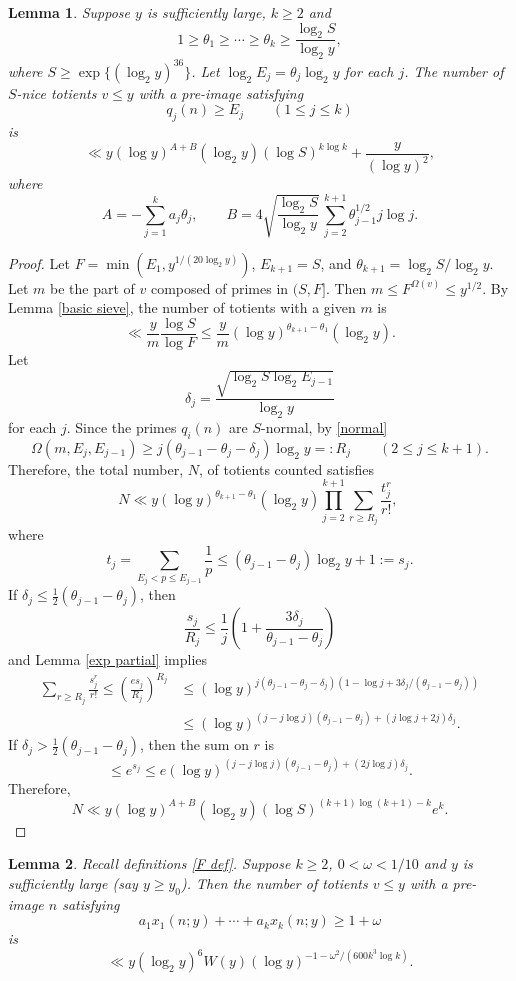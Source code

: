 \documentclass[11pt]{amsart}
\theoremstyle{remark}
\theoremstyle{plain}
\newtheorem{lem}{Lemma}[section]
\numberwithin{equation}{section}
\newcommand{\del}{\ensuremath{\delta}}
\renewcommand{\(}{\left(}
\renewcommand{\)}{\right)}
\newcommand{\pfrac}[2]{\left(\frac{#1}{#2}\right)}
\renewcommand{\le}{\leqslant}
\renewcommand{\ge}{\geqslant}
\renewcommand{\d}{\delta}
\newcommand{\om}{\Omega}
\begin{document}
\begin{lem} \label{AB} Suppose  $y$ is sufficiently large,
$k\ge 2$ and 
$$
1\ge \theta_1 \ge \cdots \ge \theta_{k} \ge \frac{\log_2 S}{ \log_2 y},
$$
where $S\ge \exp\{(\log_2 y)^{36}\}$.
Let $\log_2 E_j = \theta_j \log_2 y$ for
each $j$.  The number
of $S$-nice totients $v\le y$ with a pre-image satisfying
$$
q_j(n) \ge E_j \qquad (1\le j\le k)
$$
is
$$
\ll y(\log y)^{A+B}(\log_2 y)(\log S)^{k\log k} + \frac{y}{(\log y)^2},
$$
where
$$
A = -\sum_{j=1}^k a_j \theta_j, \qquad
B = 4 \sqrt{\frac{\log_2 S}{\log_2 y}}\,
 \sum_{j=2}^{k+1} \theta_{j-1}^{1/2} j\log j.
$$
\end{lem}

\begin{proof}
Let $F=\min(E_1,y^{1/(20\log_2 y)})$, $E_{k+1}=S$, and
$\theta_{k+1}=\log_2 S/\log_2 y$.
Let $m$ be the part of $v$ composed of primes in $(S,F]$.  Then
$m \le F^{\om(v)} \le y^{1/2}.$
By Lemma \ref{basic sieve}, the number of totients with a
given $m$ is
$$
\ll \frac{y}{m} \frac{\log S}{\log F} \le \frac{y}{m}(\log y)^
{\theta_{k+1}-\theta_1} (\log_2 y).
$$
Let 
$$
\d_j=\frac{\sqrt{\log_2 S \log_2 E_{j-1}}}{\log_2 y}
$$
for each $j$.
Since the primes $q_i(n)$ are $S$-normal, by \eqref{normal} 
$$
\om(m,E_j,E_{j-1}) \ge j(\theta_{j-1}-\theta_j-\d_j)
\log_2 y =: R_j \qquad (2\le j\le k+1).
$$
Therefore, the total number, $N$, of totients counted satisfies
$$
N \ll y(\log y)^{\theta_{k+1}-\theta_1} (\log_2 y)\prod_{j=2}^{k+1}
 \sum_{r\ge R_j} \frac{t_j^r}{r!},\
$$
where
$$
t_j = \sum_{E_j < p \le E_{j-1}} \frac1{p}\le (\theta_{j-1}-\theta_j)\log_2 y+1 
:= s_j.
$$
If $\d_j \le \frac12 (\theta_{j-1}-\theta_j)$, then
$$
\frac{s_j}{R_j} \le \frac{1}{j} \( 1 + \frac{3\d_j}{\theta_{j-1}-\theta_j}\)
$$
and Lemma \ref{exp partial} implies
\begin{align*}
\sum_{r \ge R_j} \frac{s_j^r}{r!} \le \pfrac{es_j}{R_j}^{R_j}
&\le (\log y)^{j(\theta_{j-1}-\theta_j-\d_j)(1-\log j + 3\d_j/
(\theta_{j-1}-\theta_j))} \\
&\le (\log y)^{(j-j\log j)(\theta_{j-1}-\theta_j)+(j\log j+2j)\d_j}.
\end{align*}
If  $\d_j > \frac12 (\theta_{j-1}-\theta_j)$, then the sum on $r$ is
$$
\le e^{s_j} \le e (\log y)^{(j-j\log j)(\theta_{j-1}-\theta_j)+(2j\log j)\del_j}.
$$
Therefore, 
$$
N \ll y (\log y)^{ A + B}(\log_2 y)(\log S)^{(k+1)\log(k+1)-k} e^k.
$$
\end{proof}

\begin{lem}\label{Yk} 
Recall definitions \eqref{F def}.
Suppose $k\ge 2$, $0<\omega<1/10$ and $y$ is
sufficiently large (say $y\ge y_0$).  Then the number of totients $v\le y$
with a pre-image $n$ satisfying
$$
a_1 x_1(n;y) + \cdots + a_k x_k(n;y) \ge 1+\omega
$$
is
$$
\ll y (\log_2 y)^6 W(y) (\log y)^{-1-\omega^2/(600k^3\log k)}.
$$
\end{lem}
\end{document}
